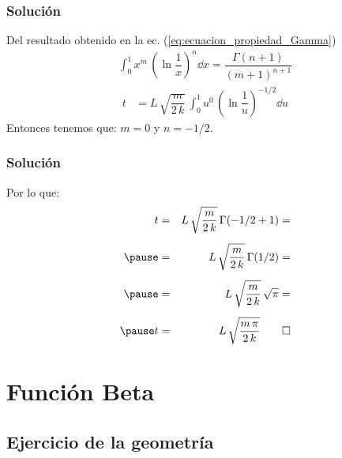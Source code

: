 \begin{frame}
\frametitle{Solución}
Del resultado obtenido en la ec. (\ref{eq:ecuacion_propiedad_Gamma})
\begin{align*}
\int_{0}^{1} x^{m} \, \left( \ln \dfrac{1}{x} \right)^{n} \dd{x} = \dfrac{\Gamma (n + 1)}{(m + 1)^{n+1}}
\end{align*}    
\pause
\begin{align*}
t &= L \, \sqrt{\dfrac{m}{2 \, k}} \, \int_{0}^{1} u^{0} \, \left( \ln \dfrac{1}{u} \right)^{-1/2} \dd{u}
\end{align*}
Entonces tenemos que: $m = 0$ y $n = -1/2$.
\end{frame}
\begin{frame}
\frametitle{Solución}
Por lo que:
\begin{eqnarray*}
t &=& L \, \sqrt{\dfrac{m}{2 \, k}} \, \Gamma(-1/2 + 1) = \\[0.5em] \pause
&=& L \, \sqrt{\dfrac{m}{2 \, k}} \, \Gamma(1/2) = \\[0.5em] \pause
&=& L \, \sqrt{\dfrac{m}{2 \, k}} \, \sqrt{\pi} = \\[0.5em] \pause
t &=& L \, \sqrt{\dfrac{m \, \pi}{2 \, k}} \qed
\end{eqnarray*}
\end{frame}

\section{Función Beta}
\subsection{Ejercicio de la geometría}



